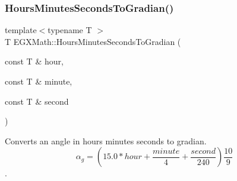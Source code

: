 \mbox{\label{group___e_g_x_math-_angle_conversions-_hours_minutes_seconds_ga1731e750f3e5561313ee9d22adff747e}} 
\subsubsection{\texorpdfstring{Hours\+Minutes\+Seconds\+To\+Gradian()}{HoursMinutesSecondsToGradian()}}
{\footnotesize\ttfamily template$<$typename T $>$ \\
T E\+G\+X\+Math\+::\+Hours\+Minutes\+Seconds\+To\+Gradian (\begin{DoxyParamCaption}\item[{const T \&}]{hour,  }\item[{const T \&}]{minute,  }\item[{const T \&}]{second }\end{DoxyParamCaption})}



Converts an angle in hours minutes seconds to gradian. \[\alpha_{g}=(15.0 * hour + \frac{minute}{4} + \frac{second}{240})\frac{10}{9}\]. 

